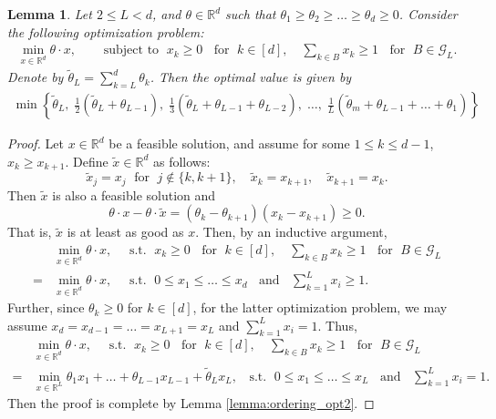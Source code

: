 \documentclass[aap,preprint]{imsart}
\newcommand{\bR}{{\mathbb{R}}}
\theoremstyle{plain}
\newtheorem{lemma}[theorem]{Lemma}
\theoremstyle{definition}
\begin{document}
\begin{appendix}
\begin{lemma} \label{lemma:ordering_opt1}
Let $2 \leq L < d$, and $\theta \in \bR^d$ such that $\theta_1 \geq \theta_2 \geq \ldots \geq \theta_d \geq 0$. Consider the following optimization problem:
\begin{align*}
    \min_{x \in \bR^d} \theta \cdot x, \quad &\text{ subject to }\; x_k \geq 0\;\; \text{ for } \;k \in [d], \quad
     \sum_{k \in B} x_k \geq 1 \;\; \text{ for } \;B \in \mathcal{G}_L.
\end{align*}
Denote by $\tilde{\theta}_L = \sum_{k=L}^{d} \theta_k$. Then the optimal value is given by
\begin{align*}
    \min\left\{
    \tilde{\theta}_L,\; \frac{1}{2}(\tilde{\theta}_{L} + {\theta}_{L-1}),\; \frac{1}{3}(\tilde{\theta}_L + {\theta}_{L-1} + \theta_{L-2}),\; \ldots,\; \frac{1}{L}\left(\tilde{\theta}_m + {\theta}_{L-1} +  \ldots + \theta_{1} \right)
    \right\}
\end{align*}
\end{lemma}
\begin{proof}
Let $x \in \bR^d$ be a feasible solution, and assume for some $1 \leq k \leq d-1$, $x_k \geq x_{k+1}$. Define $\tilde{x} \in \bR^d$ as follows:
$$
\tilde{x}_j = x_j\; \text{ for } \;j \not \in \{k,k+1\}, \quad
\tilde{x}_k = x_{k+1}, \quad \tilde{x}_{k+1} = x_k.
$$
Then $\tilde{x}$ is also a feasible solution and 
$$
\theta \cdot x - \theta \cdot \tilde{x} = (\theta_k - \theta_{k+1}) (x_k - x_{k+1}) \geq 0.
$$
That is, $\tilde{x}$ is at least as good as $x$. Then, by an inductive argument,
\begin{align*}
&\min_{x \in \bR^d} \theta \cdot x, \quad \text{ s.t. }\; x_k \geq 0\;\; \text{ for } \;k \in [d], \quad
     \sum_{k \in B} x_k \geq 1 \;\; \text{ for } \;B \in \mathcal{G}_L \\
=& \min_{x \in \bR^d} \theta \cdot x, \quad \text{ s.t. }\; 0 \leq x_1  \leq \ldots \leq x_{d} \;\; \text{ and } \;\; \sum_{k=1}^{L} x_i \geq 1.
\end{align*}
Further, since $\theta_k \geq 0$ for $k \in [d]$, for the latter optimization problem, we may assume $x_{d} = x_{d-1} = \ldots = x_{L+1} = x_{L}$ and $\sum_{k=1}^{L} x_i = 1$. Thus,
\begin{align*}
&\min_{x \in \bR^d} \theta \cdot x, \quad \text{ s.t. }\; x_k \geq 0\;\; \text{ for } \;k \in [d], \quad
     \sum_{k \in B} x_k \geq 1 \;\; \text{ for } \;B \in \mathcal{G}_L \\
=& \min_{x \in \bR^L} \theta_1 x_1 + \ldots + \theta_{L-1}x_{L-1} + \tilde{\theta}_L x_L, \;\; \text{ s.t. }\; 0 \leq x_1  \leq \ldots \leq x_{L} \;\; \text{ and } \;\; \sum_{k=1}^{L} x_i = 1.
\end{align*}
Then the proof is complete by Lemma \ref{lemma:ordering_opt2}.
\end{proof}



\end{appendix}
\end{document}
